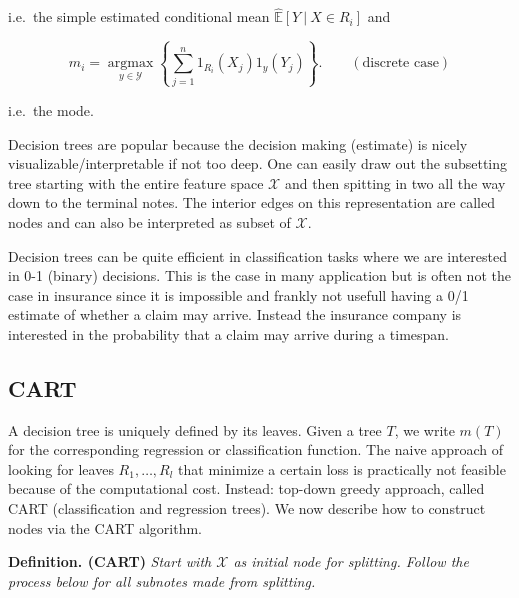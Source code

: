 \documentclass[
]{book}
\begin{document}
i.e.~the simple estimated conditional mean \(\mathbb {\hat E}[Y\ \vert\ X\in R_i]\) and

\[
m_i=\underset{y\in \mathcal Y}{\operatorname{argmax}}\left\{\sum_{j=1}^n1_{R_i}(X_j)1_{y}(Y_j)\right\}.\qquad (\text{discrete case})
\]

i.e.~the mode.

Decision trees are popular because the decision making (estimate) is nicely visualizable/interpretable if not too deep. One can easily draw out the subsetting tree starting with the entire feature space \(\mathcal X\) and then spitting in two all the way down to the terminal notes. The interior edges on this representation are called nodes and can also be interpreted as subset of \(\mathcal X\).

Decision trees can be quite efficient in classification tasks where we are interested in 0-1 (binary) decisions. This is the case in many application but is often not the case in insurance since it is impossible and frankly not usefull having a 0/1 estimate of whether a claim may arrive. Instead the insurance company is interested in the probability that a claim may arrive during a timespan.

\hypertarget{cart}{%
\subsection{CART}\label{cart}}

A decision tree is uniquely defined by its leaves. Given a tree \(T\), we write \(m(T)\) for the corresponding regression or classification function. The naive approach of looking for leaves \(R_1,\dots, R_l\) that minimize a certain loss is practically not feasible because of the computational cost. Instead: top-down greedy approach, called CART (classification and regression trees). We now describe how to construct nodes via the CART algorithm.

\textbf{Definition. (CART)} \emph{Start with \(\mathcal X\) as initial node for splitting. Follow the process below for all subnotes made from splitting.}
\end{document}
